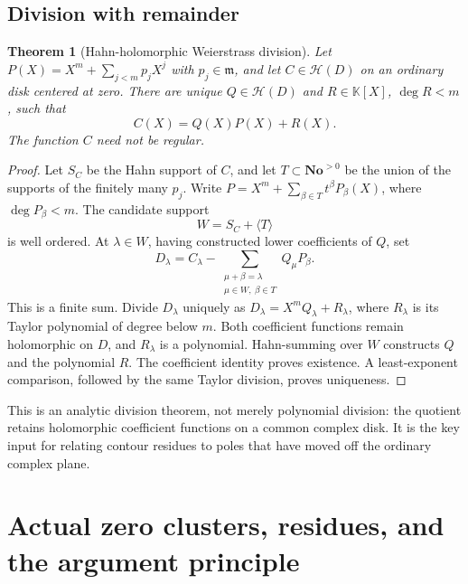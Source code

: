 \documentclass[11pt,a4paper]{article}
\numberwithin{equation}{section}
\newtheorem{theorem}{Theorem}[section]
\theoremstyle{definition}
\theoremstyle{remark}
\newcommand{\No}{\mathbf{No}}
\newcommand{\K}{\mathbb K}
\newcommand{\mm}{\mathfrak m}
\newcommand{\HH}{\mathscr H}
\begin{document}
\subsection{Division with remainder}
\begin{theorem}[Hahn-holomorphic Weierstrass division]
\label{thm:division}
Let
$P(X)=X^m+\sum_{j<m}p_jX^j$ with $p_j\in\mm$, and let $C\in\HH(D)$ on an ordinary disk centered at zero. There are unique $Q\in\HH(D)$ and $R\in\K[X]$, $\deg R<m$, such that
\[
 C(X)=Q(X)P(X)+R(X).
\]
The function $C$ need not be regular.
\end{theorem}
\begin{proof}
Let $S_C$ be the Hahn support of $C$, and let $T\subset\No^{>0}$ be the union of the supports of the finitely many $p_j$. Write $P=X^m+\sum_{\beta\in T}t^\beta P_\beta(X)$, where $\deg P_\beta<m$. The candidate support
\[
 W=S_C+\langle T\rangle
\]
is well ordered. At $\lambda\in W$, having constructed lower coefficients of $Q$, set
\[
 D_\lambda=C_\lambda-
 \sum_{\substack{\mu+\beta=\lambda\\\mu\in W,\ \beta\in T}}
 Q_\mu P_\beta.
\]
This is a finite sum. Divide $D_\lambda$ uniquely as
$D_\lambda=X^mQ_\lambda+R_\lambda$, where $R_\lambda$ is its Taylor polynomial of degree below $m$. Both coefficient functions remain holomorphic on $D$, and $R_\lambda$ is a polynomial. Hahn-summing over $W$ constructs $Q$ and the polynomial $R$. The coefficient identity proves existence. A least-exponent comparison, followed by the same Taylor division, proves uniqueness.
\end{proof}

This is an analytic division theorem, not merely polynomial division: the quotient retains holomorphic coefficient functions on a common complex disk. It is the key input for relating contour residues to poles that have moved off the ordinary complex plane.

\section{Actual zero clusters, residues, and the argument principle}
\label{sec:clusters}
\end{document}
